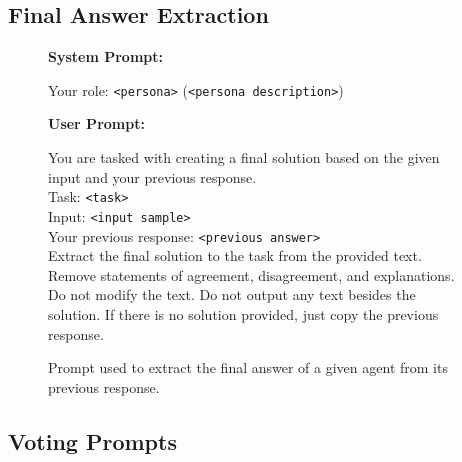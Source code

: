 \subsection{Final Answer Extraction}
\label{sec:app_final_answer_prompt}
\medskip
\begin{figure}[H]
    \centering
    \begin{combinedprompt}
    \textbf{System Prompt:} \\
    \begingroup
    \colorbox{systemcolor}{\parbox{\dimexpr\linewidth-2\fboxsep\relax}{
    Your role: \texttt{<persona>} (\texttt{<persona description>})
    }}
    \endgroup

    \vspace{0.4em} %

    \textbf{User Prompt:} \\
    \begingroup
    \colorbox{usercolor}{\parbox{\dimexpr\linewidth-2\fboxsep\relax}{
    You are tasked with creating a final solution based on the given input and your previous response.\\
    Task: \texttt{<task>}\\
    Input: \texttt{<input sample>}\\
    Your previous response: \texttt{<previous answer>}\\
    Extract the final solution to the task from the provided text. Remove statements of agreement, disagreement, and explanations. Do not modify the text. Do not output any text besides the solution. If there is no solution provided, just copy the previous response.
    }}
    \endgroup
\end{combinedprompt}
    \caption{Prompt used to extract the final answer of a given agent from its previous response.}
    \label{fig:extract_prompt}
\end{figure}

\subsection{Voting Prompts}
\label{app:voting_prompts}

